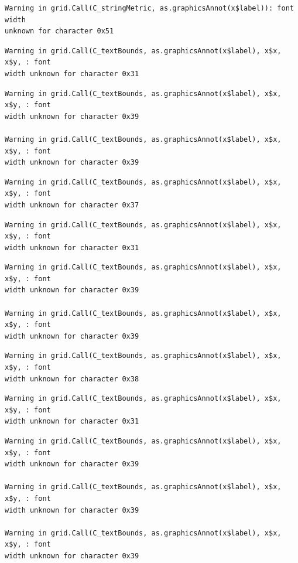\documentclass[
  letterpaper,
  DIV=11,
  numbers=noendperiod]{scrreprt}
\begin{document}
\begin{verbatim}
Warning in grid.Call(C_stringMetric, as.graphicsAnnot(x$label)): font width
unknown for character 0x51
\end{verbatim}

\begin{verbatim}
Warning in grid.Call(C_textBounds, as.graphicsAnnot(x$label), x$x, x$y, : font
width unknown for character 0x31
\end{verbatim}

\begin{verbatim}
Warning in grid.Call(C_textBounds, as.graphicsAnnot(x$label), x$x, x$y, : font
width unknown for character 0x39

Warning in grid.Call(C_textBounds, as.graphicsAnnot(x$label), x$x, x$y, : font
width unknown for character 0x39
\end{verbatim}

\begin{verbatim}
Warning in grid.Call(C_textBounds, as.graphicsAnnot(x$label), x$x, x$y, : font
width unknown for character 0x37
\end{verbatim}

\begin{verbatim}
Warning in grid.Call(C_textBounds, as.graphicsAnnot(x$label), x$x, x$y, : font
width unknown for character 0x31
\end{verbatim}

\begin{verbatim}
Warning in grid.Call(C_textBounds, as.graphicsAnnot(x$label), x$x, x$y, : font
width unknown for character 0x39

Warning in grid.Call(C_textBounds, as.graphicsAnnot(x$label), x$x, x$y, : font
width unknown for character 0x39
\end{verbatim}

\begin{verbatim}
Warning in grid.Call(C_textBounds, as.graphicsAnnot(x$label), x$x, x$y, : font
width unknown for character 0x38
\end{verbatim}

\begin{verbatim}
Warning in grid.Call(C_textBounds, as.graphicsAnnot(x$label), x$x, x$y, : font
width unknown for character 0x31
\end{verbatim}

\begin{verbatim}
Warning in grid.Call(C_textBounds, as.graphicsAnnot(x$label), x$x, x$y, : font
width unknown for character 0x39

Warning in grid.Call(C_textBounds, as.graphicsAnnot(x$label), x$x, x$y, : font
width unknown for character 0x39

Warning in grid.Call(C_textBounds, as.graphicsAnnot(x$label), x$x, x$y, : font
width unknown for character 0x39
\end{verbatim}
\end{document}
